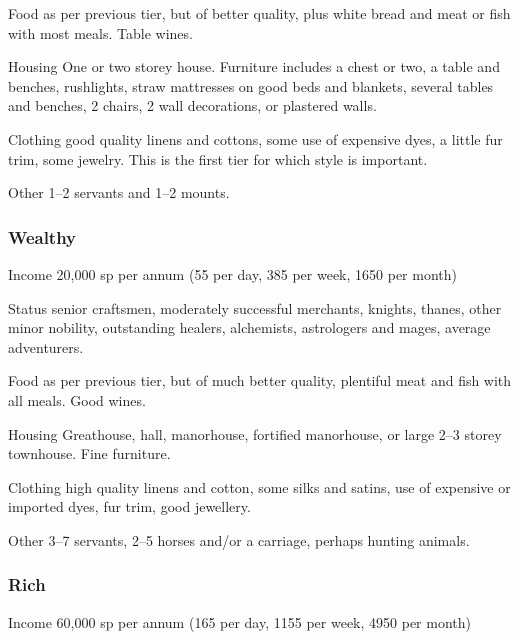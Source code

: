 \documentclass[twoside,a4paper]{article}
\begin{document}
\begin{multicols}{2}
\begin{idesc}
\item[Food] as per previous tier, but of better quality, plus white
bread and meat or fish with most meals. Table wines.

\item[Housing] One or two storey house. Furniture includes a chest or
two, a table and benches, rushlights, straw mattresses on good beds
and blankets, several tables and benches, 2 chairs, 2 wall
decorations, or plastered walls.

\item[Clothing] good quality linens and cottons, some use of expensive
dyes, a little fur trim, some jewelry.  This is the first tier for
which style is important.

\item[Other] 1--2 servants and 1--2 mounts.

\end{idesc}


\subsubsection{Wealthy}

\begin{idesc}

\item[Income] 20,000 sp per annum (55 per day, 385 per week, 1650 per month)

\item[Status] senior craftsmen, moderately successful merchants,
knights, thanes, other minor nobility, outstanding healers,
alchemists, astrologers and mages, average adventurers.

\item[Food] as per previous tier, but of much better quality,
plentiful meat and fish with all meals. Good wines.

\item[Housing] Greathouse, hall, manorhouse, fortified manorhouse, or
large 2--3 storey townhouse. Fine furniture.

\item[Clothing] high quality linens and cotton, some silks and satins,
use of expensive or imported dyes, fur trim, good jewellery.

\item[Other] 3--7 servants, 2--5 horses and/or a carriage, perhaps
hunting animals.

\end{idesc}

\subsubsection{Rich}
\begin{idesc}
\item[Income] 60,000 sp per annum (165 per day, 1155 per week, 4950
per month)


\end{idesc}
\end{multicols}
\end{document}
